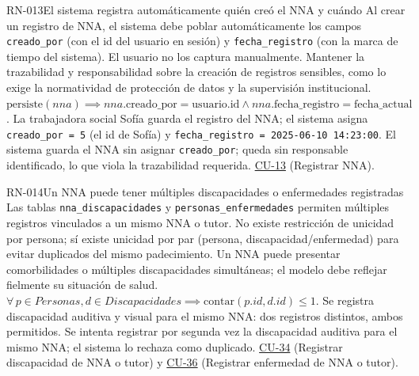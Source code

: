 \begin{BussinesRule}[%
	\brClassification{\btDerivation}{\bcIntegrity}{\blStrict}%
	]{RN-013}{El sistema registra automáticamente quién creó el NNA y cuándo}
	\BRitem[Descripción:] Al crear un registro de NNA, el sistema debe poblar automáticamente los campos \texttt{creado\_por} (con el id del usuario en sesión) y \texttt{fecha\_registro} (con la marca de tiempo del sistema). El usuario no los captura manualmente.
	\BRitem[Motivación:] Mantener la trazabilidad y responsabilidad sobre la creación de registros sensibles, como lo exige la normatividad de protección de datos y la supervisión institucional.
	\BRitem[Sentencia:] $\text{persiste}(nna) \implies nna.\text{creado\_por} = \text{usuario.id} \land nna.\text{fecha\_registro} = \text{fecha\_actual}$.
	 La trabajadora social Sofía guarda el registro del NNA; el sistema asigna \texttt{creado\_por = 5} (el id de Sofía) y \texttt{fecha\_registro = 2025-06-10 14:23:00}.
	 El sistema guarda el NNA sin asignar \texttt{creado\_por}; queda sin responsable identificado, lo que viola la trazabilidad requerida.
	 \hyperlink{CU-13}{CU-13} (Registrar NNA).
\end{BussinesRule}

\begin{BussinesRule}[%
	\brClassification{\btEnabler}{\bcCondition}{\blStrict}%
	]{RN-014}{Un NNA puede tener múltiples discapacidades o enfermedades registradas}
	\BRitem[Descripción:] Las tablas \texttt{nna\_discapacidades} y \texttt{personas\_enfermedades} permiten múltiples registros vinculados a un mismo NNA o tutor. No existe restricción de unicidad por persona; sí existe unicidad por par (persona, discapacidad/enfermedad) para evitar duplicados del mismo padecimiento.
	\BRitem[Motivación:] Un NNA puede presentar comorbilidades o múltiples discapacidades simultáneas; el modelo debe reflejar fielmente su situación de salud.
	\BRitem[Sentencia:] $\forall \, p \in Personas, d \in Discapacidades \implies \text{contar}(p.id, d.id) \le 1$.
	 Se registra discapacidad auditiva y visual para el mismo NNA: dos registros distintos, ambos permitidos.
	 Se intenta registrar por segunda vez la discapacidad auditiva para el mismo NNA; el sistema lo rechaza como duplicado.
	 \hyperlink{CU-34}{CU-34} (Registrar discapacidad de NNA o tutor) y \hyperlink{CU-36}{CU-36} (Registrar enfermedad de NNA o tutor).
\end{BussinesRule}


